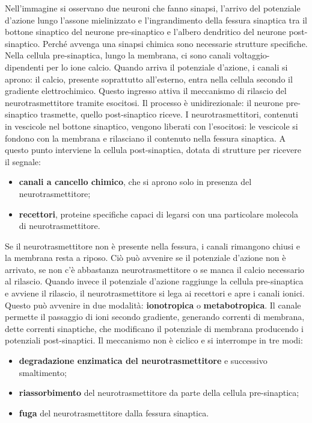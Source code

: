 Nell’immagine si osservano due neuroni che fanno sinapsi, l’arrivo del potenziale d’azione lungo l’assone mielinizzato e l’ingrandimento della fessura sinaptica tra il bottone sinaptico del neurone pre-sinaptico e l’albero dendritico del neurone post-sinaptico. Perché avvenga una sinapsi chimica sono necessarie strutture specifiche. Nella cellula pre-sinaptica, lungo la membrana, ci sono canali voltaggio-dipendenti per lo ione calcio. Quando arriva il potenziale d’azione, i canali si aprono: il calcio, presente soprattutto all’esterno, entra nella cellula secondo il gradiente elettrochimico. Questo ingresso attiva il meccanismo di rilascio del neurotrasmettitore tramite esocitosi. Il processo è unidirezionale: il neurone pre-sinaptico trasmette, quello post-sinaptico riceve.
I neurotrasmettitori, contenuti in vescicole nel bottone sinaptico, vengono liberati con l’esocitosi: le vescicole si fondono con la membrana e rilasciano il contenuto nella fessura sinaptica. A questo punto interviene la cellula post-sinaptica, dotata di strutture per ricevere il segnale:
\begin{itemize}
    \item \textbf{canali a cancello chimico}, che si aprono solo in presenza del neurotrasmettitore;
    \item \textbf{recettori}, proteine specifiche capaci di legarsi con una particolare molecola di neurotrasmettitore.
\end{itemize}
Se il neurotrasmettitore non è presente nella fessura, i canali rimangono chiusi e la membrana resta a riposo. Ciò può avvenire se il potenziale d’azione non è arrivato, se non c’è abbastanza neurotrasmettitore o se manca il calcio necessario al rilascio. Quando invece il potenziale d’azione raggiunge la cellula pre-sinaptica e avviene il rilascio, il neurotrasmettitore si lega ai recettori e apre i canali ionici. Questo può avvenire in due modalità: \textbf{ionotropica} o \textbf{metabotropica}. Il canale permette il passaggio di ioni secondo gradiente, generando correnti di membrana, dette correnti sinaptiche, che modificano il potenziale di membrana producendo i potenziali post-sinaptici. Il meccanismo non è ciclico e si interrompe in tre modi:
\begin{itemize}
    \item \textbf{degradazione enzimatica del neurotrasmettitore} e successivo smaltimento;
    \item \textbf{riassorbimento} del neurotrasmettitore da parte della cellula pre-sinaptica;
    \item \textbf{fuga} del neurotrasmettitore dalla fessura sinaptica.
\end{itemize}

